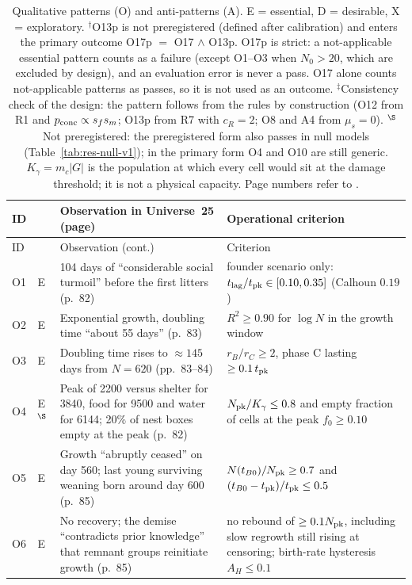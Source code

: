 \documentclass[pre,onecolumn,superscriptaddress,notitlepage]{revtex4-2}
\begin{document}
{\small
\begin{longtable}{@{}p{}p{}p{}p{}@{}}
\caption{Qualitative patterns (O) and anti-patterns (A). E = essential, D = desirable, X = exploratory.
$^\dagger$O13p is not preregistered (defined after calibration) and enters the primary outcome O17p $=$ O17 $\wedge$
O13p. O17p is strict: a not-applicable essential pattern counts as a failure (except O1--O3 when $N_0>20$, which are
excluded by design), and an evaluation error is never a pass. O17 alone counts not-applicable patterns as passes,
so it is not used as an outcome. $^\ddagger$Consistency check of the design: the pattern follows from the rules by
construction (O12 from R1 and $p_{\rm conc}\propto s_fs_m$; O13p from R7 with $c_R=2$; O8 and A4 from $\mu_s=0$).
$^\S$Not preregistered: the preregistered form also passes in null models (Table~\ref{tab:res-null-v1});
in the primary form O4 and O10 are still generic. $K_\gamma=m_c|G|$ is the population at which every cell would
sit at the damage threshold; it is not a physical capacity. Page numbers refer to \cite{Calhoun1973}.}
\label{tab:observations-full}\\
\toprule
ID & & Observation in Universe~25 (page) & Operational criterion \\
\midrule
\endfirsthead
\toprule
ID & & Observation (cont.) & Criterion \\
\midrule
\endhead
\bottomrule
\endfoot
O1 & E & 104 days of ``considerable social turmoil'' before the first litters (p.~82) & founder scenario only: $t_{\rm lag}/t_{\rm pk}\in[0.10,0.35]$ (Calhoun $0.19$) \\
O2 & E & Exponential growth, doubling time ``about 55 days'' (p.~83) & $R^2\ge 0.90$ for $\log N$ in the growth window \\
O3 & E & Doubling time rises to ${\approx}145$ days from $N=620$ (pp.~83--84) & $r_B/r_C\ge 2$, phase C lasting $\ge 0.1\,t_{\rm pk}$ \\
O4 & E$^\S$ & Peak of 2200 versus shelter for 3840, food for 9500 and water for 6144; 20\% of nest boxes empty at the peak (p.~82) & $N_{\rm pk}/K_\gamma\le 0.8$ and empty fraction of cells at the peak $f_0\ge0.10$ \\
O5 & E & Growth ``abruptly ceased'' on day 560; last young surviving weaning born around day 600 (p.~85) & $N(t_{B0})/N_{\rm pk}\ge 0.7$ and $(t_{B0}-t_{\rm pk})/t_{\rm pk}\le 0.5$ \\
O6 & E & No recovery; the demise ``contradicts prior knowledge'' that remnant groups reinitiate growth (p.~85) & no rebound of $\ge 0.1N_{\rm pk}$, including slow regrowth still rising at censoring; birth-rate hysteresis $A_H\le 0.1$ \\

\end{longtable}}
\end{document}
